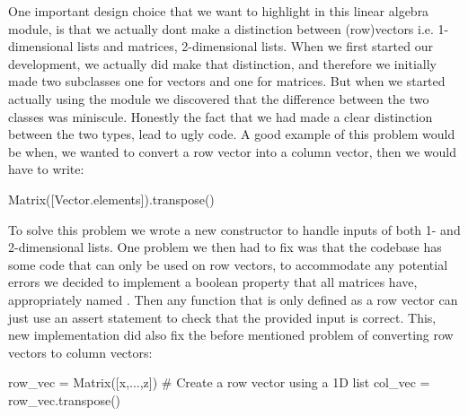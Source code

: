 \documentclass[a4paper,oneside,article,english]{memoir}
\begin{document}
One important design choice that we want to highlight in this linear algebra
module, is that we actually dont make a distinction between (row)vectors i.e.
1-dimensional lists and matrices, 2-dimensional lists. When we first started our
development, we actually did make that distinction, and therefore we initially
made two subclasses one for vectors and one for matrices. But when we started
actually using the module we discovered that the difference between the two
classes was miniscule. Honestly the fact that we had made a clear distinction
between the two types, lead to ugly code. A good example of this problem would
be when, we wanted to convert a row vector into a column vector, then we would
have to write:
\begin{python}
Matrix([Vector.elements]).transpose()
\end{python}
To solve this problem we wrote a new 
constructor to handle inputs of both 1- and 2-dimensional lists. One problem we
then had to fix was that the codebase has some code that can only be used on row
vectors, to accommodate any potential errors we decided to implement a boolean
property that all matrices have, appropriately named
. Then any function that is only defined as
a row vector can just use an assert statement to check that the provided
 input is correct. This, new implementation did also fix
the before mentioned problem of converting row vectors to column vectors:
\begin{python}
row_vec = Matrix([x,...,z]) # Create a row vector using a 1D list 
col_vec = row_vec.transpose() 
\end{python}


\end{document}
